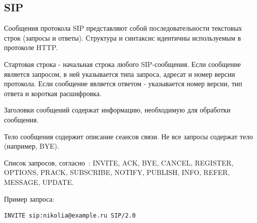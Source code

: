 \subsection{SIP}
Сообщения протокола SIP представляют собой последовательности текстовых строк (запросы и ответы). Структура и синтаксис идентичны используемым в протоколе HTTP.

Стартовая строка - начальная строка любого SIP-сообщения. Если сообщение является запросом, в ней указывается типа запроса, адресат и номер версии протокола. Если сообщение является ответом - указывается номер версии, тип ответа и короткая расшифровка.

Заголовки сообщений содержат информацию, необходимую для обработки сообщения.

Тело сообщения содержит описание сеансов связи. Не все запросы содержат тело (например, BYE).

Список запросов, согласно~\cite{sip_rfc}: INVITE, ACK, BYE, CANCEL, REGISTER, OPTIONS, PRACK, SUBSCRIBE, NOTIFY, PUBLISH, INFO, REFER, MESSAGE, UPDATE.

Пример запроса:
\begin{lstlisting}
INVITE sip:nikolia@example.ru SIP/2.0
\end{lstlisting}

